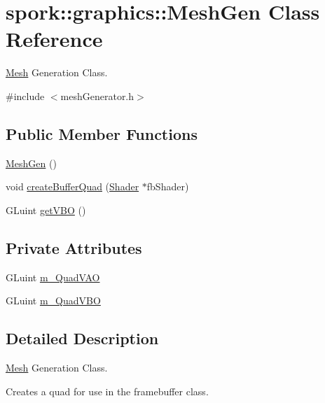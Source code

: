 \hypertarget{classspork_1_1graphics_1_1_mesh_gen}{}\section{spork\+:\+:graphics\+:\+:Mesh\+Gen Class Reference}
\label{classspork_1_1graphics_1_1_mesh_gen}


\hyperlink{classspork_1_1graphics_1_1_mesh}{Mesh} Generation Class.  




{\ttfamily \#include $<$mesh\+Generator.\+h$>$}

\subsection*{Public Member Functions}
\begin{DoxyCompactItemize}
\item 
\hyperlink{classspork_1_1graphics_1_1_mesh_gen_acc265ae1890d5a5268f48c5960de6a1f}{Mesh\+Gen} ()
\item 
void \hyperlink{classspork_1_1graphics_1_1_mesh_gen_ad15ba27a156496c1a538ab7852a444ac}{create\+Buffer\+Quad} (\hyperlink{classspork_1_1graphics_1_1_shader}{Shader} $\ast$fb\+Shader)
\item 
G\+Luint \hyperlink{classspork_1_1graphics_1_1_mesh_gen_ae7ffe47a2dcfa33314f121b83b598220}{get\+V\+BO} ()
\end{DoxyCompactItemize}
\subsection*{Private Attributes}
\begin{DoxyCompactItemize}
\item 
G\+Luint \hyperlink{classspork_1_1graphics_1_1_mesh_gen_ad7ebcb76446729575a4e20ca21ea4be2}{m\+\_\+\+Quad\+V\+AO}
\item 
G\+Luint \hyperlink{classspork_1_1graphics_1_1_mesh_gen_af81ec5ecb2e0a95e6ba8180e80f42433}{m\+\_\+\+Quad\+V\+BO}
\end{DoxyCompactItemize}


\subsection{Detailed Description}
\hyperlink{classspork_1_1graphics_1_1_mesh}{Mesh} Generation Class. 

Creates a quad for use in the framebuffer class. 

